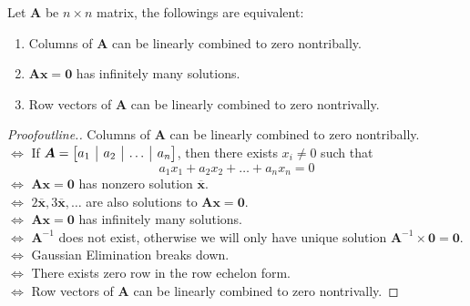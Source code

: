 \begin{theorem}
Let $\bm A$ be $n\times n$ matrix, the followings are equivalent:
\begin{enumerate}
\item
Columns of $\bm A$ can be linearly combined to zero nontribally.
\item
$\bm{Ax} = \bm 0$ has infinitely many solutions.
\item
Row vectors of $\bm A$ can be linearly combined to zero nontrivally.
\end{enumerate}
\end{theorem}
\begin{proof}[Proofoutline.]
Columns of $\bm A$ can be linearly combined to zero nontribally.\\
$\Leftrightarrow$
If 
$\bm A = \left[
\begin{array}{@{}c|c|c|c@{}}
a_1&a_2&\dots&a_n
\end{array}\right]$, then there exists $x_i \ne 0$ such that 
\[
a_1x_1+a_2x_2+\dots+a_nx_n = 0
\]
$\Leftrightarrow$
$\bm{Ax} = \bm 0$ has nonzero solution $\overline{\bm x}$.\\
$\Leftrightarrow$
$2\overline{\bm x},3\overline{\bm x},\dots$ are also solutions to $\bm{Ax} = \bm 0$.\\
$\Leftrightarrow$
$\bm{Ax} = \bm 0$ has infinitely many solutions.
\\$\Leftrightarrow$
$\bm{A}^{-1}$ does not exist, otherwise we will only have unique solution $\bm A^{-1}\times \bm 0 = \bm 0$.
\\$\Leftrightarrow$
Gaussian Elimination breaks down.
\\$\Leftrightarrow$
There exists zero row in the row echelon form.
\\$\Leftrightarrow$
Row vectors of $\bm A$ can be linearly combined to zero nontrivally.
\end{proof}














